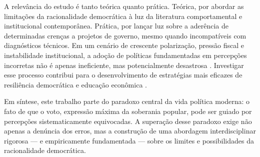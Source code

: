 A relevância do estudo é tanto teórica quanto prática. Teórica, por abordar as limitações da racionalidade democrática à luz da literatura comportamental e institucional contemporânea. Prática, por lançar luz sobre a aderência de determinadas crenças a projetos de governo, mesmo quando incompatíveis com diagnósticos técnicos. Em um cenário de crescente polarização, pressão fiscal e instabilidade institucional, a adoção de políticas fundamentadas em percepções incorretas não é apenas ineficiente, mas potencialmente desastrosa \cite{schumpeter1976capitalism,taleb2014antifragile}. Investigar esse processo contribui para o desenvolvimento de estratégias mais eficazes de resiliência democrática e educação econômica \cite{franco2022cartas,zaller1992nature}.

Em síntese, este trabalho parte do paradoxo central da vida política moderna: o fato de que o voto, expressão máxima da soberania popular, pode ser guiado por percepções sistematicamente equivocadas. A superação desse paradoxo exige não apenas a denúncia dos erros, mas a construção de uma abordagem interdisciplinar rigorosa — e empiricamente fundamentada — sobre os limites e possibilidades da racionalidade democrática.


